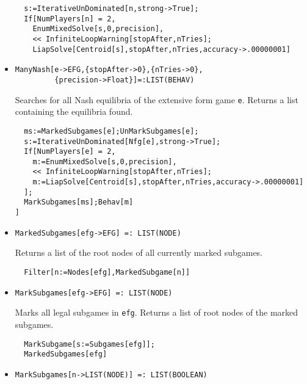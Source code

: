 \begin{itemize}
\begin{verbatim}
  s:=IterativeUnDominated[n,strong->True];
  If[NumPlayers[n] = 2, 
    EnumMixedSolve[s,0,precision],
    << InfiniteLoopWarning[stopAfter,nTries];
    LiapSolve[Centroid[s],stopAfter,nTries,accuracy->.00000001]
\end{verbatim} 
\ed

\item{}
\protect \large \begin{verbatim}
ManyNash[e->EFG,{stopAfter->0},{nTries->0},
         {precision->Float}]=:LIST(BEHAV)
\end{verbatim}\normalsize

\bd 
Searches for all Nash equilibria of the extensive form game
\verb+e+.  Returns a list containing the equilibria found.

\begin{verbatim}
  ms:=MarkedSubgames[e];UnMarkSubgames[e];
  s:=IterativeUnDominated[Nfg[e],strong->True];
  If[NumPlayers[e] = 2, 
    m:=EnumMixedSolve[s,0,precision],
    << InfiniteLoopWarning[stopAfter,nTries];
    m:=LiapSolve[Centroid[s],stopAfter,nTries,accuracy->.00000001]
  ];
  MarkSubgames[ms];Behav[m]
]  
\end{verbatim} 
\ed

\item{}
\protect \large \begin{verbatim}
MarkedSubgames[efg->EFG] =: LIST(NODE) 
\end{verbatim}\normalsize

\bd 
Returns a list of the root nodes of all currently marked subgames.  
\begin{verbatim}
  Filter[n:=Nodes[efg],MarkedSubgame[n]]
\end{verbatim} 
\ed

\item{}
\protect \large \begin{verbatim}
MarkSubgames[efg->EFG] =: LIST(NODE) 
\end{verbatim}\normalsize

\bd 
Marks all legal subgames in \verb+efg+.  Returns a list of root nodes
of the marked subgames.  
\begin{verbatim}
  MarkSubgame[s:=Subgames[efg]];
  MarkedSubgames[efg]
\end{verbatim} 
\ed


\item{}
\protect \large \begin{verbatim}
MarkSubgames[n->LIST(NODE)] =: LIST(BOOLEAN) 
\end{verbatim}\normalsize


\end{itemize}
